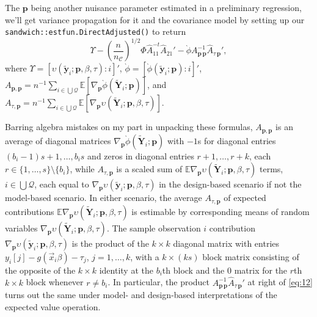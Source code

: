 \documentclass{article}
\begin{document}
The $\mathbf{p}$ being another nuisance parameter estimated in a
preliminary regression, we'll get variance propagation for it and the
covariance model by setting up our
\texttt{sandwich::estfun.DirectAdjusted()} to return
\begin{equation}\label{eq:12}
  \Upsilon -
  \left(\frac{n}{n_{\mathcal{C}}}\right)^{1/2}\Phi
  \hat{A}_{11}^{-t}\hat{A}_{21}' - \grave{\phi}
  A_{\mathbf{p}\,\mathbf{p}}^{-1}\hat{A}_{\tau\,\mathbf{p}}', 
\end{equation}
where $\Upsilon =
[\upsilon(\tilde{\mathbf{y}}_{i}; \mathbf{p}, \beta, \tau) : i]'$,
$\grave{\phi}= [\grave{\phi}(\tilde{\mathbf{y}}_{i}; \mathbf{p}): i]'$, 
$A_{\mathbf{p}, \mathbf{p}} = n^{-1}\sum_{i\in \bigcup
  \mathcal{Q}}\mathbb{E} [\nabla_{\mathbf{p}}\grave{\phi}(\tilde{\mathbf{Y}}_{i};
\mathbf{p})]$, and $A_{\tau, \mathbf{p}} = n^{-1} \sum_{i\in \bigcup
  \mathcal{Q}}\mathbb{E}[\nabla_{\mathbf{p}}\upsilon(\tilde{\mathbf{Y}}_{i};
\mathbf{p}, \beta, \tau)]$.

Barring algebra mistakes on my part in unpacking these formulas, $A_{\mathbf{p}, \mathbf{p}}$ is
an average of diagonal matrices $\nabla_{\mathbf{p}}\grave{\phi}(\tilde{\mathbf{Y}}_{i};
\mathbf{p})$ with $-1$s for diagonal entries $(b_{i}-1)s+1, \ldots,
b_{i}s$ and zeros in diagonal entries $r+1, \ldots, r+k$, each
$r \in \{1, \ldots, s\}\setminus \{b_{i}\}$, while $A_{\tau,
  \mathbf{p}}$ is a scaled sum of $\mathbb{E} \nabla_{\mathbf{p}}\upsilon(\tilde{\mathbf{Y}}_{i};
\mathbf{p}, \beta, \tau)$ terms, $i \in \bigcup \mathcal{Q}$, each equal to $\nabla_{\mathbf{p}}\upsilon(\tilde{\mathbf{y}}_{i};
\mathbf{p}, \beta, \tau)$ in the design-based scenario if not the
model-based scenario.  In either scenario, the average $A_{\tau,
  \mathbf{p}}$ of expected contributions $\mathbb{E} \nabla_{\mathbf{p}}\upsilon(\tilde{\mathbf{Y}}_{i};
\mathbf{p}, \beta, \tau)$ is estimable by corresponding means of
random variables $\nabla_{\mathbf{p}}\upsilon(\tilde{\mathbf{Y}}_{i};
\mathbf{p}, \beta, \tau)$.  The sample observation $i$ contribution $\nabla_{\mathbf{p}}\upsilon(\tilde{\mathbf{y}}_{i};
\mathbf{p}, \beta, \tau)$ is the product of the $k \times k$
diagonal matrix with entries $y_{i}[j] - g(\vec{x}_{i}\beta) -
\tau_{j}$, $j=1, \ldots, k$, with a $k \times (ks)$ block matrix
consisting of the opposite of the $k\times k$ identity at the
$b_{i}$th block and the 0 matrix for the $r$th $k \times k$ block whenever
$r\neq b_{i}$.  In particular, the product
$A_{\mathbf{p}\,\mathbf{p}}^{-1}\hat{A}_{\tau\,\mathbf{p}}'$ at right
of \eqref{eq:12} turns out the same under model- and design-based
interpretations of the expected value operation.
\end{document}
